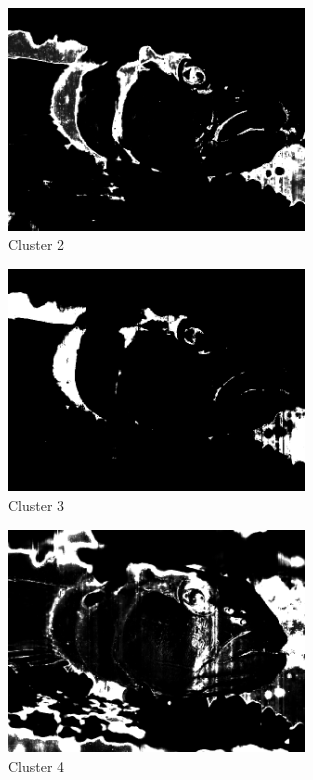 \documentclass{article}      %
\begin{document}
\begin{figure}[H]
\centering
\includegraphics[width=0.7\textwidth]{partd_wts_cluster1}
\caption{Cluster 2}
\end{figure}

\begin{figure}[H]
\centering
\includegraphics[width=0.7\textwidth]{partd_wts_cluster2}
\caption{Cluster 3}
\end{figure}

\begin{figure}[H]
\centering
\includegraphics[width=0.7\textwidth]{partd_wts_cluster3}
\caption{Cluster 4}
\end{figure}
\end{document}
